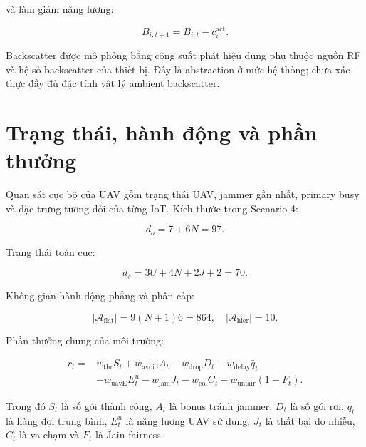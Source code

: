 và làm giảm năng lượng:

\begin{equation}
B_{i,t+1}=B_{i,t}-c_i^{\mathrm{act}}.
\label{eq:active_energy}
\end{equation}

Backscatter được mô phỏng bằng công suất phát hiệu dụng phụ thuộc nguồn RF và hệ số backscatter của thiết bị. Đây là abstraction ở mức hệ thống; chưa xác thực đầy đủ đặc tính vật lý ambient backscatter.

\section{Trạng thái, hành động và phần thưởng}

Quan sát cục bộ của UAV gồm trạng thái UAV, jammer gần nhất, primary busy và đặc trưng tương đối của từng IoT. Kích thước trong Scenario 4:

\begin{equation}
d_o=7+6N=97.
\label{eq:local_obs_dim}
\end{equation}

Trạng thái toàn cục:

\begin{equation}
d_s=3U+4N+2J+2=70.
\label{eq:global_state_dim}
\end{equation}

Không gian hành động phẳng và phân cấp:

\begin{equation}
|\mathcal{A}_{\mathrm{flat}}|=9(N+1)6=864,\quad
|\mathcal{A}_{\mathrm{hier}}|=10.
\label{eq:action_dims}
\end{equation}

Phần thưởng chung của môi trường:

\begin{equation}
\begin{aligned}
r_t ={}& w_{\mathrm{thr}}S_t + w_{\mathrm{avoid}}A_t
- w_{\mathrm{drop}}D_t - w_{\mathrm{delay}}\bar{q}_t \\
&- w_{\mathrm{uavE}}E^u_t - w_{\mathrm{jam}}J_t
- w_{\mathrm{col}}C_t - w_{\mathrm{unfair}}(1-F_t).
\end{aligned}
\label{eq:reward}
\end{equation}

Trong đó \(S_t\) là số gói thành công, \(A_t\) là bonus tránh jammer, \(D_t\) là số gói rơi, \(\bar{q}_t\) là hàng đợi trung bình, \(E^u_t\) là năng lượng UAV sử dụng, \(J_t\) là thất bại do nhiễu, \(C_t\) là va chạm và \(F_t\) là Jain fairness.

